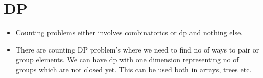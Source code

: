 \documentclass[../Notes.tex]{subfiles}
\begin{document}
	\chapter{DP}
	\begin{itemize}
		\item Counting problems either involves combinatorics or dp and nothing else.
		\item There are counting DP problem's where we need to find no of ways to pair or group elements. We can have dp with one dimension representing no of groups which are not closed yet. This can be used both in arrays, trees etc.  
	\end{itemize}
\end{document}
